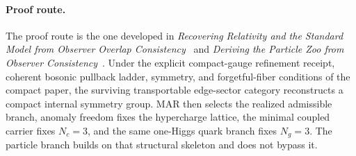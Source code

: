 \paragraph{Proof route.}
The proof route is the one developed in
\emph{Recovering Relativity and the Standard Model from Observer Overlap Consistency}~\cite{ophcompact}
and
\emph{Deriving the Particle Zoo from Observer Consistency}~\cite{ophparticles}.
Under the explicit compact-gauge refinement receipt, coherent bosonic pullback ladder, symmetry,
and forgetful-fiber conditions of the compact paper, the surviving transportable edge-sector category reconstructs a compact internal
symmetry group. MAR then selects the realized admissible branch, anomaly freedom
fixes the hypercharge lattice, the minimal coupled carrier fixes \(N_c=3\), and the same
one-Higgs quark branch fixes \(N_g=3\). The particle branch builds on that structural skeleton and does not bypass
it.

